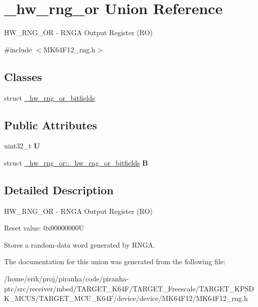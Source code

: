 \hypertarget{union__hw__rng__or}{}\section{\+\_\+hw\+\_\+rng\+\_\+or Union Reference}
\label{union__hw__rng__or}


H\+W\+\_\+\+R\+N\+G\+\_\+\+OR -\/ R\+N\+GA Output Register (RO)  




{\ttfamily \#include $<$M\+K64\+F12\+\_\+rng.\+h$>$}

\subsection*{Classes}
\begin{DoxyCompactItemize}
\item 
struct \hyperlink{struct__hw__rng__or_1_1__hw__rng__or__bitfields}{\+\_\+hw\+\_\+rng\+\_\+or\+\_\+bitfields}
\end{DoxyCompactItemize}
\subsection*{Public Attributes}
\begin{DoxyCompactItemize}
\item 
uint32\+\_\+t {\bfseries U}\hypertarget{union__hw__rng__or_afa43a8d87b60ec368e488103a1072287}{}\label{union__hw__rng__or_afa43a8d87b60ec368e488103a1072287}

\item 
struct \hyperlink{struct__hw__rng__or_1_1__hw__rng__or__bitfields}{\+\_\+hw\+\_\+rng\+\_\+or\+::\+\_\+hw\+\_\+rng\+\_\+or\+\_\+bitfields} {\bfseries B}\hypertarget{union__hw__rng__or_a8effb00bd90251489066395969537bee}{}\label{union__hw__rng__or_a8effb00bd90251489066395969537bee}

\end{DoxyCompactItemize}


\subsection{Detailed Description}
H\+W\+\_\+\+R\+N\+G\+\_\+\+OR -\/ R\+N\+GA Output Register (RO) 

Reset value\+: 0x00000000U

Stores a random-\/data word generated by R\+N\+GA. 

The documentation for this union was generated from the following file\+:\begin{DoxyCompactItemize}
\item 
/home/erik/proj/piranha/code/piranha-\/ptc/src/receiver/mbed/\+T\+A\+R\+G\+E\+T\+\_\+\+K64\+F/\+T\+A\+R\+G\+E\+T\+\_\+\+Freescale/\+T\+A\+R\+G\+E\+T\+\_\+\+K\+P\+S\+D\+K\+\_\+\+M\+C\+U\+S/\+T\+A\+R\+G\+E\+T\+\_\+\+M\+C\+U\+\_\+\+K64\+F/device/device/\+M\+K64\+F12/M\+K64\+F12\+\_\+rng.\+h\end{DoxyCompactItemize}
